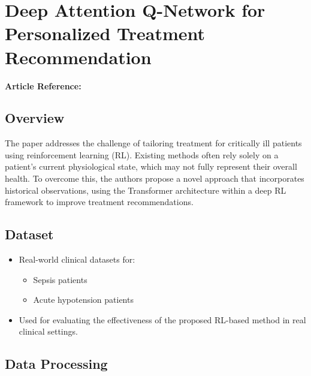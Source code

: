 \section{Deep Attention Q-Network for Personalized Treatment Recommendation}
\textbf{Article Reference:} \cite{article_16}

\subsection*{Overview}
The paper  addresses the challenge of tailoring treatment for critically ill patients using reinforcement learning (RL). Existing methods often rely solely on a patient's current physiological state, which may not fully represent their overall health. To overcome this, the authors propose a novel approach that incorporates historical observations, using the Transformer architecture within a deep RL framework to improve treatment recommendations.

\subsection*{Dataset}
\begin{itemize}
    \item Real-world clinical datasets for:
    \begin{itemize}
        \item Sepsis patients
        \item Acute hypotension patients
    \end{itemize}
    \item Used for evaluating the effectiveness of the proposed RL-based method in real clinical settings.
\end{itemize}

\subsection*{Data Processing}

